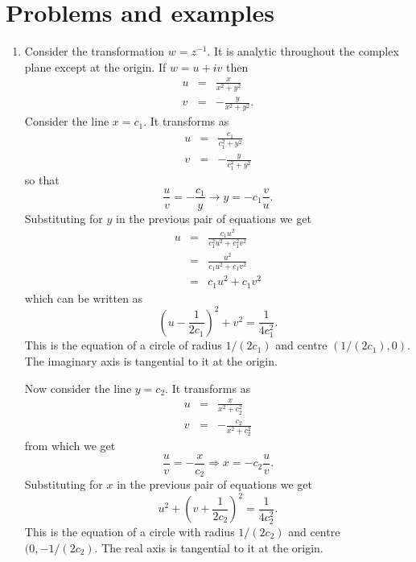 \section{Problems and examples}\label{c3s2}
\begin{enumerate}
\item Consider the transformation $w = z^{-1}$. It is analytic throughout the
complex plane except at the origin. If $w = u + iv$ then
\begin{eqnarray*}
u &=& \frac{x}{x^2 + y^2} \\
v &=& -\frac{y}{x^2 + y^2}.
\end{eqnarray*}
Consider the line $x = c_1$. It transforms as
\begin{eqnarray*}
u &=& \frac{c_1}{c_1^2 + y^2} \\
v &=& -\frac{y}{c_1^2 + y^2}
\end{eqnarray*}
so that
\[
\frac{u}{v} = -\frac{c_1}{y} \rightarrow y = -c_1\frac{v}{u}.
\]
Substituting for $y$ in the previous pair of equations we get
\begin{eqnarray*}
u &=& \frac{c_1 u^2}{c_1^2u^2 + c_1^2v^2} \\
  &=& \frac{u^2}{c_1u^2 + c_1 v^2} \\
  &=& c_1u^2 + c_1v^2
\end{eqnarray*}
which can be written as
\[
\left(u - \frac{1}{2c_1}\right)^2 + v^2 = \frac{1}{4c_1^2}.
\]
This is the equation of a circle of radius $1/(2c_1)$ and centre $(1/(2c_1), 0)$.
The imaginary axis is tangential to it at the origin.

Now consider the line $y = c_2$. It transforms as
\begin{eqnarray*}
u &=& \frac{x}{x^2 + c_2^2} \\
v &=& -\frac{c_2}{x^2 + c_2^2}
\end{eqnarray*}
from which we get
\[
\frac{u}{v} = -\frac{x}{c_2} \Rightarrow x = -c_2\frac{u}{v}.
\]
Substituting for $x$ in the previous pair of equations we get
\[
u^2 + \left(v + \frac{1}{2c_2}\right)^2 = \frac{1}{4c_2^2}.
\]
This is the equation of a circle with radius $1/(2c_2)$ and centre $(0, -1/(2c_2)$.
The real axis is tangential to it at the origin.

\end{enumerate}

